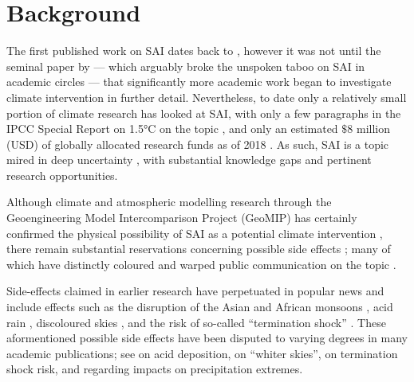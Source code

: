 \documentclass{article}
\begin{document}
\section*{Background}
The first published work on SAI dates back to \citet{budyko1977climatic}, however it was not until the seminal paper by \citet{crutzen2006albedo} --- which arguably broke the unspoken taboo on SAI in academic circles --- that significantly more academic work began to investigate climate intervention in further detail. Nevertheless, to date only a relatively small portion of climate research has looked at SAI, with only a few paragraphs in the IPCC Special Report on 1.5°C on the topic \citep{intergovernmental2018global,reynolds2021solar}, and only an estimated $\$8$ million (USD) of globally allocated research funds as of 2018 \citep{funds2018}. As such, SAI is a topic mired in deep uncertainty \citep{marchau2019decision}, with substantial knowledge gaps and pertinent research opportunities. \medskip

Although climate and atmospheric modelling research through the Geoengineering Model Intercomparison Project (GeoMIP) has certainly confirmed the physical possibility of SAI as a potential climate intervention \citep{kravitz2011geoengineering,kravitz2013climate,yu2015impacts}, there remain substantial reservations concerning possible side effects \citep{kravitz2020uncertainty}; many of which have distinctly coloured and warped public communication on the topic \citep{cairns2016climates,buck2019after,reynolds2016five}.\medskip

Side-effects claimed in earlier research have perpetuated in popular news and include effects such as the disruption of the Asian and African monsoons \citep{robock200820}, acid rain \citep{egArticleAcid}, discoloured skies \citep{Kolbert2021}, and the risk of so-called ``termination shock'' \citep{pierrehumbert2019there}. These aformentioned possible side effects have been disputed to varying degrees in many academic publications; see \citet{visioni2020goes} on acid deposition, \citet{kravitz2012colour} on ``whiter skies'', \citet{parker2018risk} on termination shock risk, and \citet{irvine2019halving, irvine2020halving} regarding impacts on precipitation extremes. \medskip
\end{document}

